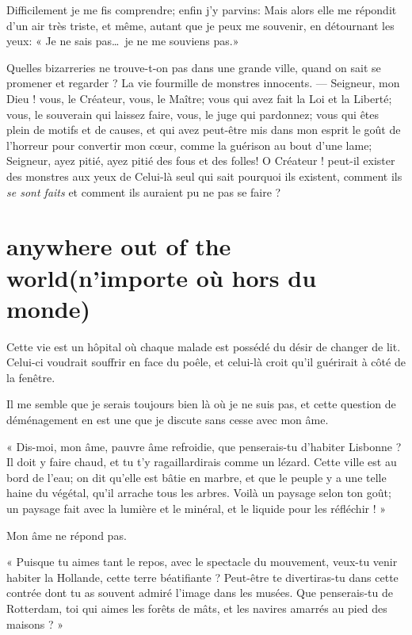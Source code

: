 Difficilement je me fis comprendre; enfin j’y parvins:
Mais alors elle me répondit d’un air très triste, et
même, autant que je peux me souvenir, en détournant les yeux: « Je ne
sais pas\ldots\ je ne me souviens pas.»

Quelles bizarreries ne trouve{}-t{}-on pas dans une grande ville, quand
on sait se promener et regarder ? La vie fourmille de monstres
innocents. --- Seigneur, mon Dieu ! vous, le Créateur, vous, le Maître;
vous qui avez fait la Loi et la Liberté; vous, le souverain qui laissez
faire, vous, le juge qui pardonnez; vous qui êtes plein de motifs et de
causes, et qui avez peut{}-être mis dans mon esprit le goût de
l’horreur pour convertir mon c\oe ur, comme la guérison
au bout d’une lame; Seigneur, ayez pitié, ayez pitié
des fous et des folles! O Créateur ! peut{}-il exister des monstres aux
yeux de Celui{}-là seul qui sait pourquoi ils existent, comment ils \textit{se
sont faits} et comment ils auraient pu ne pas se faire ?

\quebra\section[Anywhere out of the world (n’importe où hors du monde)]{anywhere out of the world\break (n’importe où hors du monde)}

Cette vie est un hôpital où chaque malade est possédé du désir de
changer de lit. Celui{}-ci voudrait souffrir en face du poêle, et
celui{}-là croit qu’il guérirait à côté de la fenêtre.

Il me semble que je serais toujours bien là où je ne suis pas, et cette
question de déménagement en est une que je discute sans cesse avec mon
âme.

« Dis{}-moi, mon âme, pauvre âme refroidie, que penserais{}-tu
d’habiter Lisbonne ? Il doit y faire chaud, et tu
t’y ragaillardirais comme un lézard. Cette ville est
au bord de l’eau; on dit qu’elle est
bâtie en marbre, et que le peuple y a une telle haine du végétal,
qu’il arrache tous les arbres. Voilà un paysage selon
ton goût; un paysage fait avec la lumière et le minéral, et le liquide
pour les réfléchir ! »

Mon âme ne répond pas.

« Puisque tu aimes tant le repos, avec le spectacle du mouvement,
veux{}-tu venir habiter la Hollande, cette terre béatifiante ?
Peut{}-être te divertiras{}-tu dans cette contrée dont tu as souvent
admiré l’image dans les musées. Que penserais{}-tu de
Rotterdam, toi qui aimes les forêts de mâts, et les navires amarrés au
pied des maisons ? »

